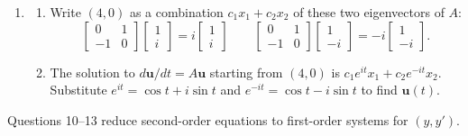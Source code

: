 \documentclass[14pt, a4paper]{article}
\begin{document}
\begin{enumerate}
    \item
          \begin{enumerate}
              \item Write $(4, 0)$ as a combination $c_1 x_1 + c_2 x_2$ of these two eigenvectors of $A$:
                    \[
                        \begin{bmatrix} 0 & 1 \\ -1 & 0 \end{bmatrix} \begin{bmatrix} 1 \\ i \end{bmatrix} = i \begin{bmatrix} 1 \\ i \end{bmatrix} \qquad \begin{bmatrix} 0 & 1 \\ -1 & 0 \end{bmatrix} \begin{bmatrix} 1 \\ -i \end{bmatrix} = -i \begin{bmatrix} 1 \\ -i \end{bmatrix} .
                    \]
              \item The solution to $d\mathbf{u}/dt = A\mathbf{u}$ starting from $(4, 0)$ is $c_1 e^{it}x_1 + c_2 e^{-it}x_2$. Substitute $e^{it} = \cos t + i \sin t$ and $e^{-it} = \cos t - i \sin t$ to find $\mathbf{u}(t)$.
          \end{enumerate}
\end{enumerate}

\noindent Questions 10--13 reduce second-order equations to first-order systems for $(y, y')$.
\end{document}
